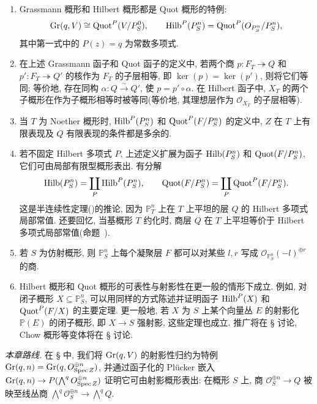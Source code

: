 \begin{remark}\label{src:2.1.5}
\begin{enumerate}[(1)]
\item Grassmann 概形和 Hilbert 概形都是 Quot 概形的特例: 
\[
\operatorname{Gr}(q,V)\cong\operatorname{Quot}^P(V/P_S^0),
\qquad
\operatorname{Hilb}^P(P_S^n)=\operatorname{Quot}^P(O_{P_S^n}/P_S^n),
\]
其中第一式中的 $P(z)=q$ 为常数多项式.
\item 在上述 Grassmann 函子和 Quot 函子的定义中, 若两个商 $p:F_T\twoheadrightarrow Q$ 和 $p':F_T\twoheadrightarrow Q'$ 的核作为 $F_T$ 的子层相等, 即 $\ker(p)=\ker(p')$, 则将它们等同; 等价地, 存在同构 $\alpha:Q\xrightarrow{\sim}Q'$, 使 $p=p'\circ\alpha$. 在 Hilbert 函子中, $X_T$ 的两个子概形在作为子概形相等时被等同(等价地, 其理想层作为 $\mathcal O_{X_T}$ 的子层相等).
\item 当 $T$ 为 Noether 概形时, $\operatorname{Hilb}^P(P_S^n)$ 和 $\operatorname{Quot}^P(F/P_S^n)$ 的定义中, $Z$ 在 $T$ 上有限表现及 $Q$ 有限表现的条件都是多余的.
\item 若不固定 Hilbert 多项式 $P$, 上述定义扩展为函子 $\operatorname{Hilb}(P_S^n)$ 和 $\operatorname{Quot}(F/P_S^n)$, 它们可由局部有限型概形表出. 有分解
\[
\operatorname{Hilb}(P_S^n)=\coprod_P\operatorname{Hilb}^P(P_S^n),
\qquad
\operatorname{Quot}(F/P_S^n)=\coprod_P\operatorname{Quot}^P(F/P_S^n).
\]
这是半连续性定理()的推论, 因为 $\mathbb P_T^n$ 上在 $T$ 上平坦的层 $Q$ 的 Hilbert 多项式局部常值. 还要回忆, 当基概形 $T$ 约化时, 商层 $Q$ 在 $T$ 上平坦等价于 Hilbert 多项式局部常值(命题~).
\item 若 $S$ 为仿射概形, 则 $\mathbb P_S^n$ 上每个凝聚层 $F$ 都可以对某些 $l,r$ 写成 $\mathcal O_{\mathbb P_S^n}(-l)^{\oplus r}$ 的商.
\item Hilbert 概形和 Quot 概形的可表性与射影性在更一般的情形下成立. 例如, 对闭子概形 $X\subseteq\mathbb P_S^n$, 可以用同样的方式陈述并证明函子 $\operatorname{Hilb}^P(X)$ 和 $\operatorname{Quot}^P(F/X)$ 的主要定理. 更一般地, 若 $X$ 为 $S$ 上某个向量丛 $E$ 的射影化 $\mathbb P(E)$ 的闭子概形, 即 $X\to S$ 强射影, 这些定理也成立. 推广将在 \S{} 讨论, Chow 概形等变体将在 \S{} 讨论.
\end{enumerate}
\end{remark}
\textit{本章路线.} 在 \S{} 中, 我们将 $\operatorname{Gr}(q,V)$ 的射影性归约为特例
$\operatorname{Gr}(q,n)=\operatorname{Gr}(q,O_{\operatorname{Spec}Z}^{\oplus n})$, 
并通过函子化的 Plücker 嵌入
$\operatorname{Gr}(q,n)\to P(\bigwedge^qO_{\operatorname{Spec}Z}^{\oplus n})$
证明它可由射影概形表出: 在概形 $S$ 上, 商 $\mathcal O_S^{\oplus n}\to Q$ 被映至线丛商 $\bigwedge^q\mathcal O_S^{\oplus n}\to\bigwedge^qQ$.
